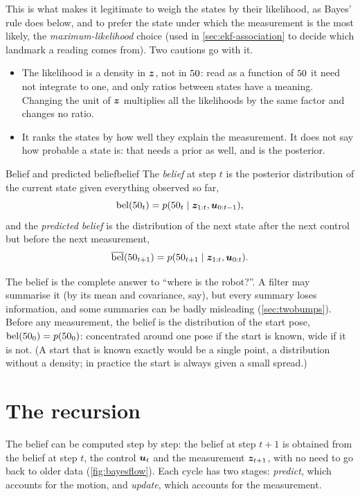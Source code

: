 This is what makes it legitimate to weigh the states by their likelihood,
as Bayes' rule does below, and to prefer the state under which the
measurement is the most likely, the \emph{maximum-likelihood} choice
(used in \cref{sec:ekf-association} to decide which landmark a reading
comes from). Two cautions go with it.
\begin{itemize}[nosep]
  \item The likelihood is a density in $\bm{z}$, not in $50$: read as a
    function of $50$ it need not integrate to one, and only ratios between
    states have a meaning. Changing the unit of $\bm{z}$ multiplies all the
    likelihoods by the same factor and changes no ratio.
  \item It ranks the states by how well they explain the measurement. It
    does not say how probable a state is: that needs a prior as well, and
    is the posterior.
\end{itemize}

\begin{definition}{Belief and predicted belief}{belief}
The \emph{belief} at step $t$ is the posterior distribution of the
current state given everything observed so far,
\[
  \operatorname{bel}(50_t)=p(50_t\mid\bm{z}_{1:t},\bm{u}_{0:t-1}),
\]
and the \emph{predicted belief} is the distribution of the next state
after the next control but before the next measurement,
\[
  \overline{\operatorname{bel}}(50_{t+1})=p(50_{t+1}\mid\bm{z}_{1:t},\bm{u}_{0:t}).
\]
\end{definition}

The belief is the complete answer to ``where is the robot?''. A filter
may summarise it (by its mean and covariance, say), but every summary
loses information, and some summaries can be badly misleading
(\cref{sec:twobumps}). Before any measurement, the belief is the
distribution of the start pose, $\operatorname{bel}(50_0)=p(50_0)$: concentrated around
one pose if the start is known, wide if it is not. (A start that is known
exactly would be a single point, a distribution without a density; in
practice the start is always given a small spread.)

\section{The recursion}

The belief can be computed step by step: the belief at step $t+1$ is
obtained from the belief at step $t$, the control $\bm{u}_t$ and the
measurement $\bm{z}_{t+1}$, with no need to go back to older data
(\cref{fig:bayesflow}). Each cycle has two stages: \emph{predict}, which
accounts for the motion, and \emph{update}, which accounts for the
measurement.

